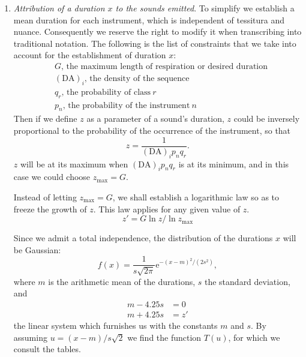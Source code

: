 \documentclass[letterpaper, 11pt]{article}
\begin{document}
\begin{enumerate}
        Thus for \((\mathrm{DA})_i = 145\) sounds/sec.
        \begin{align*}
            a &= 53.2 \ \text{semitones/sec.} \\
            2s &= 75 \ \text{semitones/sec.}
        \end{align*}
        and for \((\mathrm{DA})_i = 0.13\) sounds/sec.
        \begin{align*}
            a &= 17.7 \ \text{semitones/sec.} \\
            2s &= 25 \ \text{semitones/sec.}
        \end{align*}
    \item 
        \textit{Attribution of a duration \(x\) to the sounds emitted}.
        To simplify we establish a mean duration for each instrument, which is independent of tessitura and nuance.
        Consequently we reserve the right to modify it when transcribing into traditional notation.
        The following is the list of constraints that we take into account for the establishment of duration \(x\):
        \begin{align*}
            &G \text{, the maximum length of respiration or desired duration} \\
            &(\mathrm{DA})_i \text{, the density of the sequence} \\
            &q_r \text{, the probability of class} \ r \\
            &p_n \text{, the probability of the instrument} \ n
        \end{align*}
        Then if we define \(z\) as a parameter of a sound's duration, \(z\) could be inversely proportional to the probability of the occurrence of the instrument, so that
        \[z = \frac{1}{(\mathrm{DA})_i p_n q_r}.\]
        \(z\) will be at its maximum when \((\mathrm{DA})_i p_n q_r\) is at its minimum, and in this case we could choose \(z_{\textrm{max}} = G\).

        Instead of letting \(z_{\textrm{max}} = G\), we shall establish a logarithmic law so as to freeze the growth of \(z\).
        This law applies for any given value of \(z\).
        \[z' = G \ln{z} / \ln{z_\textrm{max}}\]

        Since we admit a total independence, the distribution of the durations \(x\) will be Gaussian:
        \[f(x) = \frac{1}{s \sqrt{2 \pi}} \mathrm{e}^{-(x - m)^2/(2s^2)},\]  
        where \(m\) is the arithmetic mean of the durations, \(s\) the standard deviation, and
        \begin{align*}
            m - 4.25s &= 0 \\
            m + 4.25s &= z'
        \end{align*}
        the linear system which furnishes us with the constants \(m\) and \(s\).
        By assuming \(u = (x-m)/s\sqrt{2}\) we find the function \(T(u)\), for which we consult the tables.


\end{enumerate}
\end{document}
